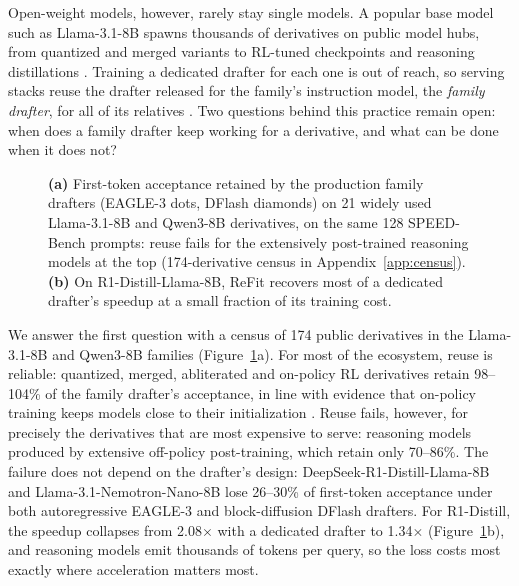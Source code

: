 \documentclass[11pt]{article}
\newcommand{\refit}{ReFit}
\begin{document}
Open-weight models, however, rarely stay single models.
A popular base model such as Llama-3.1-8B spawns thousands of derivatives on public model hubs, from quantized and merged variants to RL-tuned checkpoints and reasoning distillations \citep{horwitz2025atlas}.
Training a dedicated drafter for each one is out of reach, so serving stacks reuse the drafter released for the family's instruction model, the \emph{family drafter}, for all of its relatives \citep{kwon2023vllm,redhat2025speculators}.
Two questions behind this practice remain open: when does a family drafter keep working for a derivative, and what can be done when it does not?

\begin{figure}[t]
  \centering
  
  \caption{\textbf{(a)} First-token acceptance retained by the production family drafters (EAGLE-3 dots, DFlash diamonds) on 21 widely used Llama-3.1-8B and Qwen3-8B derivatives, on the same 128 SPEED-Bench prompts: reuse fails for the extensively post-trained reasoning models at the top (174-derivative census in Appendix~\ref{app:census}). \textbf{(b)} On R1-Distill-Llama-8B, \refit{} recovers most of a dedicated drafter's speedup at a small fraction of its training cost.}
  \label{fig:teaser}
\end{figure}

We answer the first question with a census of 174 public derivatives in the Llama-3.1-8B and Qwen3-8B families (Figure~\ref{fig:teaser}a).
For most of the ecosystem, reuse is reliable: quantized, merged, abliterated and on-policy RL derivatives retain 98--104\% of the family drafter's acceptance, in line with evidence that on-policy training keeps models close to their initialization \citep{shenfeld2026razor,chen2026retaining}.
Reuse fails, however, for precisely the derivatives that are most expensive to serve: reasoning models produced by extensive off-policy post-training, which retain only 70--86\%.
The failure does not depend on the drafter's design: DeepSeek-R1-Distill-Llama-8B and Llama-3.1-Nemotron-Nano-8B lose 26--30\% of first-token acceptance under both autoregressive EAGLE-3 and block-diffusion DFlash drafters.
For R1-Distill, the speedup collapses from 2.08$\times$ with a dedicated drafter to 1.34$\times$ (Figure~\ref{fig:teaser}b), and reasoning models emit thousands of tokens per query, so the loss costs most exactly where acceleration matters most.
\end{document}

